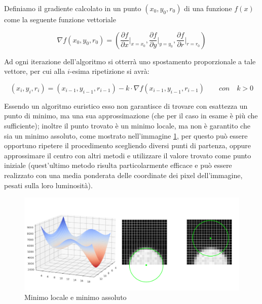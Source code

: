 \documentclass[12pt]{article}
\begin{document}
        
        Definiamo il gradiente calcolato in un punto $(x_0, y_0, r_0)$ di una funzione $f(x)$ come la seguente funzione vettoriale
        
        \begin{equation}
            \nabla f (x_0, y_0, r_0) = \left( \frac{\partial f}{\partial x} \bigg\rvert_{x = x_0}, \frac{\partial f}{\partial y} \bigg\rvert_{y = y_0}, \frac{\partial f}{\partial r} \bigg\rvert_{r = r_0} \right)
        \end{equation}
        
        \vspace{1cm}
        Ad ogni iterazione dell'algoritmo si otterrà uno spostamento proporzionale a tale vettore, per cui alla $i$-esima ripetizione si avrà:
         
        \begin{equation}
            (x_i, y_i, r_i) = (x_{i-1}, y_{i-1}, r_{i-1}) - k \cdot \nabla f (x_{i-1}, y_{i-1}, r_{i-1}) \qquad con \quad k > 0
        \end{equation}
        
        Essendo un algoritmo euristico esso non garantisce di trovare con esattezza un punto di minimo, ma una sua approssimazione (che per il caso in esame è più che sufficiente); inoltre il punto trovato è un minimo locale, ma non è garantito che sia un minimo assoluto, come mostrato nell'immagine \ref{double_min}, per questo può essere opportuno ripetere il procedimento scegliendo diversi punti di partenza, oppure approssimare il centro con altri metodi e utilizzare il valore trovato come punto iniziale (quest'ultimo metodo risulta particolarmente efficace e può essere realizzato con una media ponderata delle coordinate dei pixel dell'immagine, pesati sulla loro luminosità).
        
        \begin{figure}[h]
        \centering
            \includegraphics[width=\textwidth]{Draws/matplotlib_draws/double_min_block.png}
            \caption{Minimo locale e minimo assoluto}
            \label{double_min}
        \end{figure}
        
\end{document}

